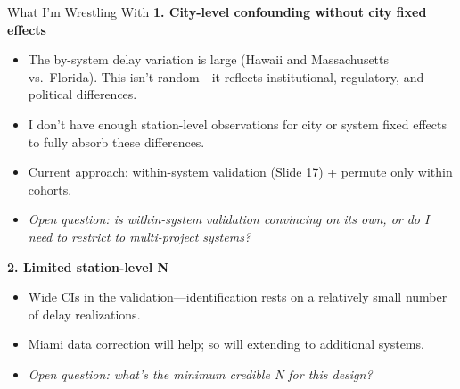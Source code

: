 \documentclass{beamer}
\begin{document}
\begin{frame}{What I'm Wrestling With}
\small
\textbf{1. City-level confounding without city fixed effects}
\begin{itemize}
    \item The by-system delay variation is large (Hawaii and Massachusetts vs.\ Florida).
          This isn't random---it reflects institutional, regulatory, and political differences.
    \item I don't have enough station-level observations for city or system fixed effects
          to fully absorb these differences.
    \item Current approach: within-system validation (Slide 17) + permute only within cohorts.
    \item \textit{Open question: is within-system validation convincing on its own, or do I
          need to restrict to multi-project systems?}
\end{itemize}

\medskip
\textbf{2. Limited station-level N}
\begin{itemize}
    \item Wide CIs in the validation---identification rests on a relatively small number
          of delay realizations.
    \item Miami data correction will help; so will extending to additional systems.
    \item \textit{Open question: what's the minimum credible N for this design?}
\end{itemize}
\end{frame}
\end{document}
